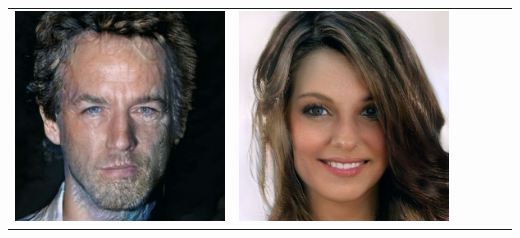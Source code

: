 \documentclass[a0,landscape]{a0poster}
\begin{document}
\begin{multicols}{3}
\begin{center}
\begin{tabular}{cc|cc|cc}
\includegraphics[width=\pganw]{../figures/pgan/60_base_iso_reject.jpg} &
\includegraphics[width=\pganw]{../figures/pgan/61_base_iso_reject.jpg} &

\end{tabular}
\end{center}
\end{multicols}
\end{document}
